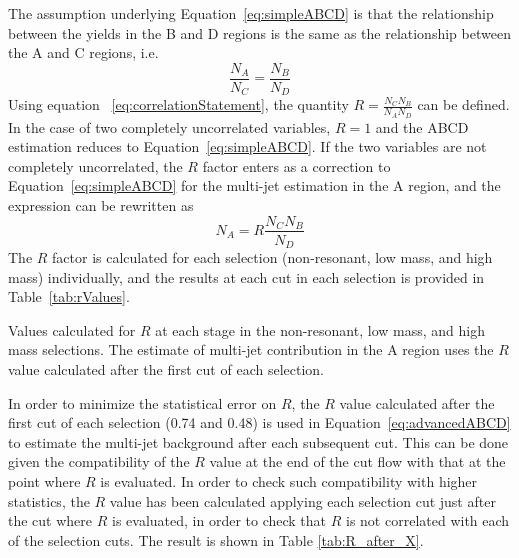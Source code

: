 The assumption underlying Equation~\ref{eq:simpleABCD} is that the relationship between the 
yields in the B and D regions is the same as the relationship between the A and C regions, i.e.
\begin{equation}
\frac{N_{A}}{N_{C}} = \frac{N_B}{N_D}
\label{eq:correlationStatement}
\end{equation}
Using equation ~\ref{eq:correlationStatement}, the quantity $R= \frac{N_{C} N_B}{N_{A} N_D}$ can be 
defined. In the case of two completely uncorrelated variables, $R=1$ and the ABCD estimation reduces 
to Equation~\ref{eq:simpleABCD}. If the two variables are not completely uncorrelated, the $R$ 
factor enters as a correction to Equation~\ref{eq:simpleABCD} for the multi-jet estimation in the A 
region, and the expression can be rewritten as
\begin{equation}
N_{A} = R \frac{N_C N_B}{N_D}
\label{eq:advancedABCD}
\end{equation}
The $R$ factor is calculated for each selection (non-resonant, low mass, and high mass) individually,
and the results at each cut in each selection is provided in
Table~\ref{tab:rValues}.


\begin{table}[h!]
\centering

\caption[Values of R at each selection]{Values calculated for $R$ at each stage in the non-resonant,
  low mass, and high mass selections. The estimate of multi-jet
  contribution in the A region uses the $R$ value calculated after the
  first cut of each selection.} \label{tab:rValues}
\end{table}
In order to minimize the statistical error on $R$, the $R$ value calculated after 
the first cut of each selection (0.74 and 0.48) is used in Equation~\ref{eq:advancedABCD} to estimate the multi-jet
background after each subsequent cut. This can be done given the
compatibility of the $R$ value at the end of the cut flow with that at
the point where $R$ is evaluated. In order to check such compatibility
with higher statistics, the $R$ value has been calculated applying
each selection cut just after the cut where $R$ is evaluated, in order
to check that $R$ is not correlated with each of the selection cuts.
The result is shown in Table \ref{tab:R_after_X}.

